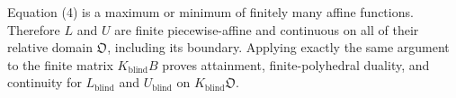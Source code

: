 Equation (4) is a maximum or minimum of finitely many affine functions.  Therefore \(L\) and \(U\) are finite piecewise-affine and continuous on all of their relative domain \(\mathfrak O\), including its boundary.  Applying exactly the same argument to the finite matrix \(K_{\mathrm{blind}}B\) proves attainment, finite-polyhedral duality, and continuity for \(L_{\mathrm{blind}}\) and \(U_{\mathrm{blind}}\) on \(K_{\mathrm{blind}}\mathfrak O\).